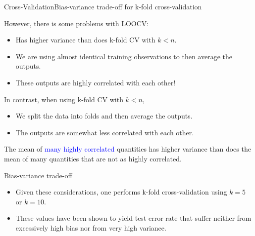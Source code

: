 \begin{frame}{Cross-Validation}{Bias-variance trade-oﬀ for k-fold cross-validation}
    
However, there is some problems with LOOCV: 

\begin{itemize}
    \item Has higher variance than does k-fold CV with $k < n$. \pause 
    \item We are using almost identical training observations to then average the outputs. \pause \\ 
    \item These outputs are highly correlated with each other! \pause 

\end{itemize}

In contrast, when using k-fold CV with $k < n$, \pause 

\begin{itemize}
    \item We split the data into folds and then average the outputs. \pause 
    \item The outputs are somewhat less correlated with each other. \pause 
\end{itemize}

The mean of \textcolor{blue}{many highly correlated} quantities has higher variance than does the mean of many quantities that are not
as highly correlated. \pause 

\begin{block}{Bias-variance trade-off}
    \begin{itemize}
        \item Given these considerations, one performs k-fold cross-validation using $k = 5$ or $k = 10$. \pause 
        \item These values have been shown to yield test error rate that suﬀer neither from excessively high bias nor from very high variance.
    \end{itemize}
\end{block}


    
\end{frame}
